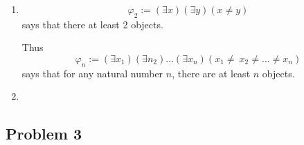 \documentclass[a4paper]{article}
\begin{document}
\begin{enumerate}

    \item

\[\varphi_2 := (\exists x)(\exists y) (x \neq y)\] says that there at least 2 objects.

Thus \[\varphi_n := (\exists x_1)(\exists n_2) \ldots (\exists x_n)( x_1 \neq \ x_2 \neq \ldots \neq x_n) \] says that for any natural number $n$, there are at least $n$ objects.

    \item


\end{enumerate}


\newpage
\subsection*{Problem 3}


\end{document}
